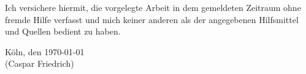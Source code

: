 
\noindent Ich versichere hiermit, die vorgelegte Arbeit in dem gemeldeten Zeitraum ohne fremde Hilfe verfasst und mich keiner anderen als der angegebenen Hilfsmittel und Quellen bedient zu haben.

\vfill

\noindent Köln, den \today \\[1cm]

\noindent (Caspar Friedrich)
